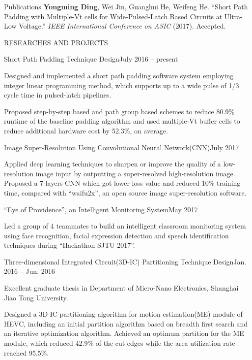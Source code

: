 \documentclass{resume_new} %
\begin{document}
\begin{rSection}{Publications}
\textbf{Yongming Ding}, Wei Jin, Guanghui He, Weifeng He. ``Short Path Padding with Multiple-Vt cells for Wide-Pulsed-Latch Based Circuits at Ultra-Low Voltage.'' \emph{IEEE International Conference on ASIC}  (2017). Accepted.
\end{rSection}

\begin{rSection}{RESEARCHES AND PROJECTS}
\begin{rSubsection}{Short Path Padding Technique Design}{July 2016 -- present}{}{}
\item Designed and implemented a short path padding software system employing integer linear programming method, which supports up to a wide pulse of 1/3 cycle time in pulsed-latch pipelines.
\item Proposed step-by-step based and path group based schemes to reduce 80.9\% runtime of the baseline padding algorithm and used multiple-Vt buffer cells to reduce additional hardware cost by 52.3\%, on average. 
\end{rSubsection}

\begin{rSubsection}{Image Super-Resolution Using Convolutional Neural Network(CNN)}{July 2017}{}{}
\item Applied deep learning techniques to sharpen or improve the quality of a low-resolution image input by outputting a super-resolved high-resolution image. Proposed a 7-layers CNN which got lower loss value and reduced 10\% training time, compared with ``waifu2x'', an open source image super-resolution software.
\end{rSubsection}

\begin{rSubsection}{``Eye of Providence'', an Intelligent Monitoring System}{May 2017}{}{}
\item Led a group of 4 teammates to build an intelligent classroom monitoring system using face recognition, facial expression detection and speech identification techniques during ``Hackathon SJTU 2017''.
\end{rSubsection}

\begin{rSubsection}{Three-dimensional Integrated Circuit(3D-IC) Partitioning Technique Design}{Jan. 2016 -- Jun. 2016}{}{}
\item Excellent graduate thesis in Department of Micro-Nano Electronics, Shanghai Jiao Tong University.
\item Designed a 3D-IC partitioning algorithm for motion estimation(ME) module of HEVC, including an initial partition algorithm based on breadth first search and an iterative optimization algorithm. Achieved an optimum partition for the ME module, which reduced 42.9\% of the cut edges while the area utilization rate reached 95.5\%.
\end{rSubsection}


\end{rSection}
\end{document}
